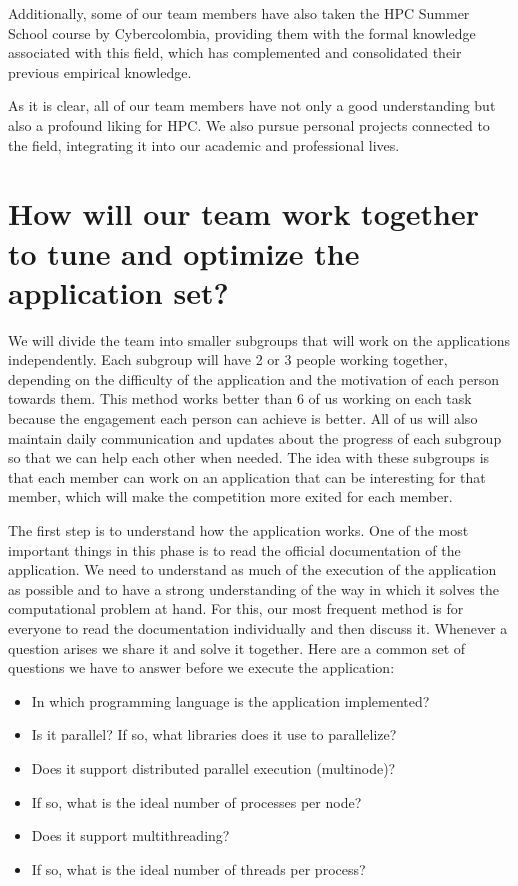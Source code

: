 \documentclass[11pt,a4paper,twocolumn]{article}
\begin{document}
Additionally, some of our team members have also taken the HPC Summer School course by Cybercolombia, providing them with the formal knowledge associated with this field, which has complemented and consolidated their previous empirical knowledge.

As it is clear, all of our team members have not only a good understanding but also a profound liking for HPC. We also pursue personal projects connected to the field, integrating it into our academic and professional lives.

\section{How will our team work together to tune and optimize the application set?}

We will divide the team into smaller subgroups that will work on the applications independently. Each subgroup will have 2 or 3 people working together, depending on the difficulty of the application and the motivation of each person towards them. This method works better than 6 of us working on each task because the engagement each person can achieve is better. All of us will also maintain daily communication and updates about the progress of each subgroup so that we can help each other when needed. The idea with these subgroups is that each member can work on an application that can be interesting for that member, which will make the competition more exited for each member.

The first step is to understand how the application works. One of the most important things in this phase is to read the official documentation of the application. We need to understand as much of the execution of the application as possible and to have a strong understanding of the way in which it solves the computational problem at hand. For this, our most frequent method is for everyone to read the documentation individually and then discuss it. Whenever a question arises we share it and solve it together. Here are a common set of questions we have to answer before we execute the application:
\begin{itemize}
    \item In which programming language is the application implemented?
    \item Is it parallel? If so, what libraries does it use to parallelize?
    \item Does it support distributed parallel execution (multinode)?
    \item If so, what is the ideal number of processes per node?
    \item Does it support multithreading?
    \item If so, what is the ideal number of threads per process?
\end{itemize}
\end{document}
